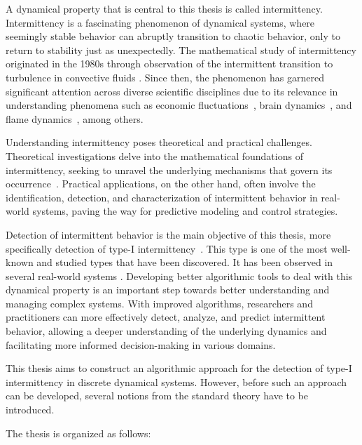 A dynamical property that is central to this thesis is called intermittency.
Intermittency is a fascinating phenomenon of dynamical systems, where seemingly stable behavior can abruptly transition to chaotic behavior, only to return to stability just as unexpectedly.
The mathematical study of intermittency originated in the 1980s through observation of the intermittent transition to turbulence in convective fluids \cite{Pomeau1980}.
Since then, the phenomenon has garnered significant attention across diverse scientific disciplines due to its relevance in understanding phenomena such as economic fluctuations~\cite{Chian2007}, brain dynamics~\cite{Paradisi2013}, and flame dynamics~\cite{Pizza20110926}, among others.
\par
Understanding intermittency poses theoretical and practical challenges.
Theoretical investigations delve into the mathematical foundations of intermittency, seeking to unravel the underlying mechanisms that govern its occurrence~\cite{Elaskar2017, Elaskar2023}.
Practical applications, on the other hand, often involve the identification, detection, and characterization of intermittent behavior in real-world systems, paving the way for predictive modeling and control strategies.
\par
Detection of intermittent behavior is the main objective of this thesis, more specifically detection of type-I intermittency~\cite{Pomeau1980,Bussac1982,DelRio2014}.
This type is one of the most well-known and studied types that have been discovered.
It has been observed in several real-world systems \cite{Zebrowski2004,Parthimos2001,Dimitriu2008,Chiriac20070701}.
Developing better algorithmic tools to deal with this dynamical property is an important step towards better understanding and managing complex systems.
With improved algorithms, researchers and practitioners can more effectively detect, analyze, and predict intermittent behavior, allowing a deeper understanding of the underlying dynamics and facilitating more informed decision-making in various domains.

\bigskip

This thesis aims to construct an algorithmic approach for the detection of type-I intermittency in discrete dynamical systems.
However, before such an approach can be developed, several notions from the standard theory have to be introduced.
\par
The thesis is organized as follows:

